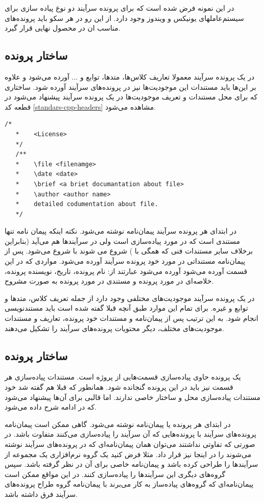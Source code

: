 در این نمونه فرض شده است که برای پرونده سرآیند  دو نوع پیاده سازی
برای سیستم‌عاملهای یونیکس و ویندوز وجود دارد. از این رو در هر سکو باید
پرونده‌های مناسب ان در محصول نهایی قرار گیرد.
    

\subsection{ساختار پرونده }
در یک پرونده سرآیند معمولا تعاریف کلاس‌ها، متدها، توابع و ... آورده می‌شود و
علاوه بر این‌ها باید مستندات این موجودیت‌ها نیز در پرونده‌های سرآیند آورده شود.
ساختاری که برای محل مستندات و تعریف موجودیت‌ها در یک پرونده سرآیند پیشنهاد
می‌شود در قطعه کد \ref{standars-cpp-headers} مشاهده می‌شود.
\begin{latin}
\lstset{language=C++}  
\begin{lstlisting}[frame=single] 
   /*
   *	<License> 
   */
   /**
   *	\file <filenamge>
   *	\date <date>
   *	\brief <a briet documantation about file>
   *	\author <author name>
   *	detailed codumentation about file.
   */
\end{lstlisting}
\label{standars-cpp-headers}
\end{latin}
در ابتدای هر پرونده سرآیند پیمان‌نامه نوشته می‌شود.
نکته اینکه پیمان نامه تنها مستندی است که در مورد پیاده‌سازی است ولی در
سرآیندها هم می‌آید (بنابراین برخلاف سایر مستندات فنی که همگی با \lr{/**}) شروع
می شوند با \lr{/*} شروع می‌شود. پس از پیمان‌نامه مستنداتی در مورد خود پرونده سر‌آیند آورده
می‌شود. مواردی که در این قسمت آورده می‌شود آورده می‌شود عبارتند از:
نام پرونده، تاریخ، نویسنده پرونده،  خلاصه‌ای در مورد پرونده و مستندی در مورد
پرونده به صورت مشروح.

در یک پرونده سرآیند موجودیت‌های مختلفی وجود دارد از جمله تعریف کلاس، متدها و
توابع و غیره. برای تمام این موارد طبق آنچه قبلا گفته شده است باید مستندنویسی
انجام شود. به این ترتیب پس از پیمان‌نامه و مستندات خود پرونده، تعاریف و مستندات
موجودیت‌های مختلف، دیگر محتویات پرونده‌های سرآیند را تشکیل می‌دهند.

\subsection{ساختار پرونده }
یک پرونده  حاوی پیاده‌سازی قسمت‌هایی از پروژه است. مستندات پیاده‌سازی
هر قسمت نیز باید در این پرونده گنجانده شود. همانطور که قبلا هم گفته شد خود
مستندات پیاده‌سازی محل و ساختار خاصی ندارند. اما قالبی برای آن‌ها پیشنهاد می‌شود
که در ادامه شرح داده می‌شود.

 در ابتدای هر پرونده  یا  پیمان‌نامه نوشته می‌شود. گاهی ممکن است
 پیمان‌نامه
پرونده‌های سرآیند با پرونده‌هایی که آن سرآیند را پیاده‌سازی می‌کنند متفاوت باشد.
در صورتی که تفاوتی نداشتند می‌توان همان پیمان‌نامه‌ای که در پرونده‌های سرآیند
نوشته می‌شوند را در اینجا نیز قرار داد. مثلا فرض کنید یک گروه نرم‌افزاری یک
مجموعه از سرآیندها را طراحی کرده باشد و پیمان‌نامه خاصی برای آن در نظر گرفته
باشد. سپس گروه‌های دیگری این سرآیندها را پیاده‌سازی کنند. در این مواقع ممکن است
پیمان‌نامه‌ای که گروه‌های پیاده‌ساز به کار می‌برند با پیمان‌نامه گروه طراح
پرونده‌های سرآیند فرق داشته باشد.

